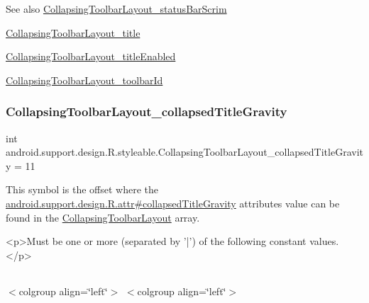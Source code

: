 \begin{DoxySeeAlso}{See also}
\hyperlink{classandroid_1_1support_1_1design_1_1R_1_1styleable_a675be9c93480a98f854416553d174e4b}{Collapsing\+Toolbar\+Layout\+\_\+status\+Bar\+Scrim} 

\hyperlink{classandroid_1_1support_1_1design_1_1R_1_1styleable_aed337c7cc5f2d54034841fd6d7dfda1d}{Collapsing\+Toolbar\+Layout\+\_\+title} 

\hyperlink{classandroid_1_1support_1_1design_1_1R_1_1styleable_aee5150e8b214ad7200a094c9faf6bbee}{Collapsing\+Toolbar\+Layout\+\_\+title\+Enabled} 

\hyperlink{classandroid_1_1support_1_1design_1_1R_1_1styleable_af10a1e768d230d7c7f1117fe0ca3de0a}{Collapsing\+Toolbar\+Layout\+\_\+toolbar\+Id} 
\end{DoxySeeAlso}
\mbox{\label{classandroid_1_1support_1_1design_1_1R_1_1styleable_a1873cdd61433f0299df88db2300d219e}} 
\subsubsection{\texorpdfstring{Collapsing\+Toolbar\+Layout\+\_\+collapsed\+Title\+Gravity}{CollapsingToolbarLayout\_collapsedTitleGravity}}
{\footnotesize\ttfamily int android.\+support.\+design.\+R.\+styleable.\+Collapsing\+Toolbar\+Layout\+\_\+collapsed\+Title\+Gravity = 11\hspace{0.3cm}{\ttfamily [static]}}

This symbol is the offset where the \hyperlink{classandroid_1_1support_1_1design_1_1R_1_1attr_accb70e3f5023e816de65788d2484b73b}{android.\+support.\+design.\+R.\+attr\#collapsed\+Title\+Gravity} attribute\textquotesingle{}s value can be found in the \hyperlink{classandroid_1_1support_1_1design_1_1R_1_1styleable_a4a019838b1c3daad84b4ffff397db335}{Collapsing\+Toolbar\+Layout} array.

\begin{DoxyVerb}      <p>Must be one or more (separated by '|') of the following constant values.</p>
\end{DoxyVerb}
 \tabulinesep=1mm
\begin{longtabu} spread 0pt [c]{*{0}{|X[-1]}|}
\hline
\end{longtabu}
$<$colgroup align=\char`\"{}left\char`\"{}$>$ $<$colgroup align=\char`\"{}left\char`\"{}$>$ 

